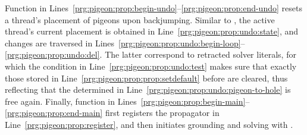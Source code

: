 Function  in Lines~\ref{prg:pigeon:prop:begin-undo}--\ref{prg:pigeon:prop:end-undo} resets a thread's placement of pigeons upon backjumping.
Similar to , %
the active thread's current placement
is obtained in Line~\ref{prg:pigeon:prop:undo:state},
and changes are traversed in Lines~\ref{prg:pigeon:prop:undo:begin-loop}--\ref{prg:pigeon:prop:undo:del}.
The latter correspond to retracted solver literals,
for which the condition in Line~\ref{prg:pigeon:prop:undo:test} makes sure
that exactly those stored in Line~\ref{prg:pigeon:prop:prop:setdefault} before are cleared,
thus reflecting that the  determined in Line~\ref{prg:pigeon:prop:undo:pigeon-to-hole}
is free again.
Finally,
function  in Lines~\ref{prg:pigeon:prop:begin-main}--\ref{prg:pigeon:prop:end-main} first registers the  propagator in Line~\ref{prg:pigeon:prop:register},
and then initiates grounding and solving with \clingo.

